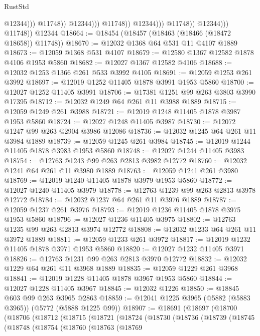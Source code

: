 \begin{lexlean}{RustStd}
\begin{coremodule}
{\begin{coremodule}
{{{{{{{{{{{{{{{{{{{{{{{{{{{{{                                            @12344)))
                                      @11748))
                                  @12344)))
                            @11748))
                        @12344)))
                  @11748))
              @12344)))
        @11748))
    @12344
@18664 := @18454 (@18457 (@18463 (@18466 (@18472 @18658)) @11748))
@18670 := @12032 @1368 @64 @531 @11 @4107 @1889
@18673 := @12059 @1368 @531 @4107
@18679 := @12580 @1367 @12582 @1878 @4106 @1953 @5860
@18682 := @12027 @1367 @12582 @4106
@18688 := @12032 @1253 @1366 @261 @533 @3992 @4105
@18691 := @12059 @1253 @261 @3992
@18697 := @12019 @1252 @11405 @1878 @3991 @1953 @5860
@18700 := @12027 @1252 @11405 @3991
@18706 := @17381 @1251 @99 @263 @3803 @3990 @17395
@18712 := @12032 @1249 @64 @261 @11 @3988 @1889
@18715 := @12059 @1249 @261 @3988
@18721 := @12019 @1248 @11405 @1878 @3987 @1953 @5860
@18724 := @12027 @1248 @11405 @3987
@18730 := @12072 @1247 @99 @263 @2904 @3986 @12086
@18736 := @12032 @1245 @64 @261 @11 @3984 @1889
@18739 := @12059 @1245 @261 @3984
@18745 := @12019 @1244 @11405 @1878 @3983 @1953 @5860
@18748 := @12027 @1244 @11405 @3983
@18754 := @12763 @1243 @99 @263 @2813 @3982 @12772
@18760 := @12032 @1241 @64 @261 @11 @3980 @1889
@18763 := @12059 @1241 @261 @3980
@18769 := @12019 @1240 @11405 @1878 @3979 @1953 @5860
@18772 := @12027 @1240 @11405 @3979
@18778 := @12763 @1239 @99 @263 @2813 @3978 @12772
@18784 := @12032 @1237 @64 @261 @11 @3976 @1889
@18787 := @12059 @1237 @261 @3976
@18793 := @12019 @1236 @11405 @1878 @3975 @1953 @5860
@18796 := @12027 @1236 @11405 @3975
@18802 := @12763 @1235 @99 @263 @2813 @3974 @12772
@18808 := @12032 @1233 @64 @261 @11 @3972 @1889
@18811 := @12059 @1233 @261 @3972
@18817 := @12019 @1232 @11405 @1878 @3971 @1953 @5860
@18820 := @12027 @1232 @11405 @3971
@18826 := @12763 @1231 @99 @263 @2813 @3970 @12772
@18832 := @12032 @1229 @64 @261 @11 @3968 @1889
@18835 := @12059 @1229 @261 @3968
@18841 := @12019 @1228 @11405 @1878 @3967 @1953 @5860
@18844 := @12027 @1228 @11405 @3967
@18845 := @12032 @1226
@18850 := @18845 @603 @99 @263 @3965 @2863
@18859 := @12041 @1225 @3965 (@5882 (@5883 @3965)) (@5772 (@5888 @1225 @99))
@18907 := @18691
    (@18697
      (@18700
        (@18706
          (@18712
            (@18715
              (@18721
                (@18724
                  (@18730
                    (@18736
                      (@18739
                        (@18745
                          (@18748
                            (@18754
                              (@18760
                                (@18763
                                  (@18769
}}}}}}}}}}}}}}}}}}}}}}}}}}}}}
\end{coremodule}}
\end{coremodule}
\end{lexlean}
